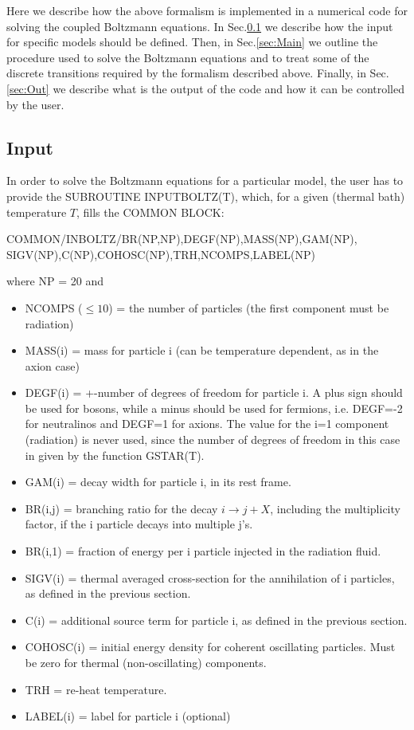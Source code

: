 \documentclass[preprint,notoc]{JHEP3}
\def\to{\rightarrow}
\def\to{\rightarrow}
\begin{document}
Here we describe how the above formalism is implemented in a numerical code for solving the coupled Boltzmann equations.
In Sec.\ref{sec:In} we describe how the input for specific models should be defined. Then, in Sec.\ref{sec:Main} we
outline the procedure used to solve the Boltzmann equations and to treat some of the discrete transitions
required by the formalism described above. Finally, in Sec.\ref{sec:Out} we describe what is the output of the code and
how it can be controlled by the user.

\subsection{Input}
\label{sec:In}

In order to solve the Boltzmann equations for a particular model,
the user has to provide the SUBROUTINE INPUTBOLTZ(T), which, for a given (thermal bath) temperature $T$,
fills the COMMON BLOCK:
\begin{center}
	COMMON/INBOLTZ/BR(NP,NP),DEGF(NP),MASS(NP),GAM(NP),\\SIGV(NP),C(NP),COHOSC(NP),TRH,NCOMPS,LABEL(NP)
\end{center}
where NP = 20 and
\begin{itemize}
\item NCOMPS ($\leq 10$) = the number of particles (the first component must be radiation)
\item MASS(i) = mass for particle i (can be temperature dependent, as in the axion case)
\item DEGF(i) = +-number of degrees of freedom for particle i. A plus sign should be used
for bosons, while a minus should be used for fermions, i.e. DEGF=-2 for neutralinos and DEGF=1 for axions. The
value for the i=1 component (radiation) is never used, since the number of degrees of freedom in this case
in given by the function GSTAR(T).
\item GAM(i) = decay width for particle i, in its rest frame.
\item BR(i,j) = branching ratio for the decay $i \to j + X$, including the multiplicity factor, if the
i particle decays into multiple j's.
\item BR(i,1) = fraction of energy per i particle injected in the radiation fluid.
\item SIGV(i) = thermal averaged cross-section for the annihilation of i particles, as defined in the previous section.
\item C(i) = additional source term for particle i, as defined in the previous section.
\item COHOSC(i) = initial energy density for coherent oscillating particles. Must be zero for thermal (non-oscillating) components.
\item TRH = re-heat temperature.
\item LABEL(i) = label for particle i (optional)
\end{itemize}
\end{document}
